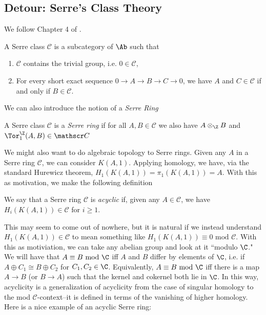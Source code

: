 \subsection{Detour: Serre's Class Theory}
We follow Chapter 4 of \cite{millerLecturesAlgebraicTopology2021}. 
\begin{definition}
    A Serre class $\mathscr C$ is a subcategory of $\Ab$ such that
    \begin{enumerate}
        \item $\mathscr C$ contains the trivial group, i.e. $0\in \mathscr C$,
        \item For every short exact sequence $0\to A\to B\to C\to 0$, we have $A$ and $C\in \mathscr C$ if and only if $B\in \mathscr C$.
    \end{enumerate}
\end{definition}
    We can also introduce the notion of a \textit{Serre Ring}
\begin{definition}
    A Serre class $\mathscr C$ is a \textit{Serre ring} if for all $A,B\in \mathscr C$ we also have $A\otimes_\Z B$ and $\Tor_1^\Z(A,B)\in \mathscr C$
\end{definition}
We might also want to do algebraic topology to Serre rings. Given any $A$ in a Serre ring $\mathscr C$, we can consider $K(A,1)$. Applying homology, we have, via the standard Hurewicz theorem, $H_1(K(A,1))=\pi_1(K(A,1))=A$. With this as motivation, we make the following definition
\begin{definition}
    We say that a Serre ring $\mathscr C$ is \textit{acyclic} if, given any $A\in \mathscr C$, we have $H_i(K(A,1))\in\mathscr C$ for $i\geq 1$. 
\end{definition}
This may seem to come out of nowhere, but it is natural if we instead understand $H_1(K(A,1))\in \mathscr C$ to mean something like $H_1(K(A,1))\equiv 0\text{ mod }\mathscr C$. With this as motiviation, we can take any abelian group and look at it ``modulo $\C$." We will have that $A\equiv B\text{ mod }\C$ iff $A$ and $B$ differ by elements of $\C$, i.e. if $A\oplus C_1\cong B\oplus C_2$ for $C_1,C_2\in \C$. Equivalently, $A\equiv B\text{ mod }\C$ iff there is a map $A\to B$ (or $B\to A$) such that the kernel and cokernel both lie in $\C$. In this way, acyclicity is a generalization of acyclicity from the case of singular homology to the mod $\mathscr C$-context--it is defined in terms of the vanishing of higher homology. Here is a nice example of an acyclic Serre ring:
